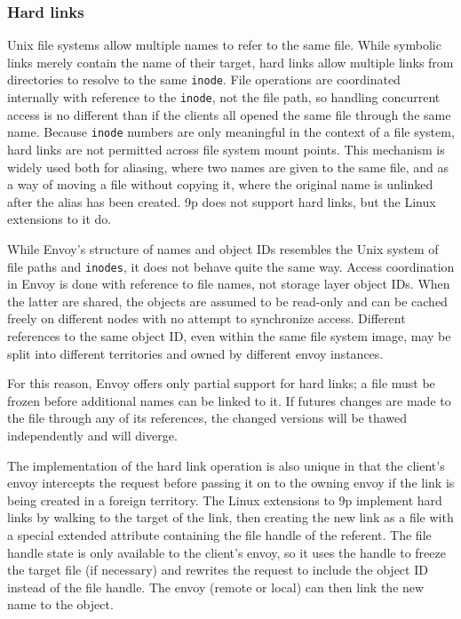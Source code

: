 \subsubsection{Hard links}\label{sec:hard-links}

Unix file systems allow multiple names to refer to the same file. While symbolic links merely contain the name of their target, hard links allow multiple links from directories to resolve to the same \texttt{inode}. File operations are coordinated internally with reference to the \texttt{inode}, not the file path, so handling concurrent access is no different than if the clients all opened the same file through the same name. Because \texttt{inode} numbers are only meaningful in the context of a file system, hard links are not permitted across file system mount points. This mechanism is widely used both for aliasing, where two names are given to the same file, and as a way of moving a file without copying it, where the original name is unlinked after the alias has been created. 9p does not support hard links, but the Linux extensions to it do.

While Envoy's structure of names and object IDs resembles the Unix system of file paths and \texttt{inodes}, it does not behave quite the same way. Access coordination in Envoy is done with reference to file names, not storage layer object IDs. When the latter are shared, the objects are assumed to be read-only and can be cached freely on different nodes with no attempt to synchronize access. Different references to the same object ID, even within the same file system image, may be split into different territories and owned by different envoy instances.

For this reason, Envoy offers only partial support for hard links; a file must be frozen before additional names can be linked to it. If futures changes are made to the file through any of its references, the changed versions will be thawed independently and will diverge.

The implementation of the hard link operation is also unique in that the client's envoy intercepts the request before passing it on to the owning envoy if the link is being created in a foreign territory. The Linux extensions to 9p implement hard links by walking to the target of the link, then creating the new link as a file with a special extended attribute containing the file handle of the referent. The file handle state is only available to the client's envoy, so it uses the handle to freeze the target file (if necessary) and rewrites the request to include the object ID instead of the file handle. The envoy (remote or local) can then link the new name to the object.

